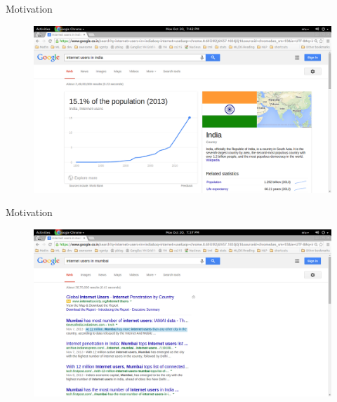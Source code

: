 \documentclass{beamer}
\begin{document}
\begin{frame}{Motivation}
 \begin{figure}[h]
 \centering
 \includegraphics[bb=0 0 1366 741,scale=0.25]{images/resultindia.png}
\end{figure}
\end{frame}

\begin{frame}{Motivation}
 \begin{figure}[h]
 \centering
 \includegraphics[bb=0 0 1366 741,scale=0.25]{images/resultmumbai.png}
\end{figure}
\end{frame}
\end{document}
